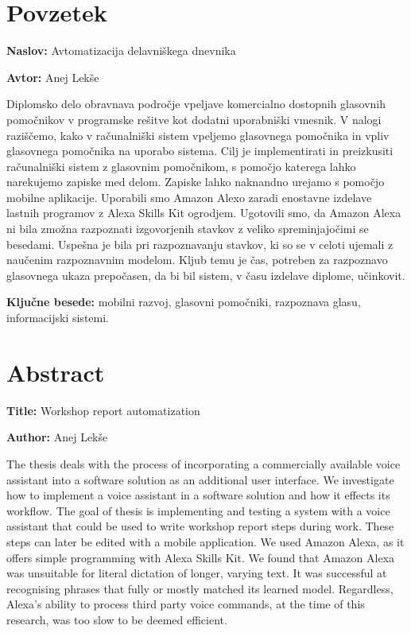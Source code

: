 \documentclass[a4paper, 12pt]{book}
\newcommand{\ttitle}{Avtomatizacija delavniškega dnevnika}
\newcommand{\ttitleEn}{Workshop report automatization}
\newcommand{\tauthor}{Anej Lekše}
\newcommand{\tkeywords}{mobilni razvoj, glasovni pomočniki, razpoznava glasu, informacijski sistemi}
\newcommand{\clearemptydoublepage}{\newpage{\pagestyle{empty}\cleardoublepage}}
\begin{document}
\chapter*{Povzetek}

\noindent\textbf{Naslov:} \ttitle
\bigskip

\noindent\textbf{Avtor:} \tauthor
\bigskip


\noindent Diplomsko delo obravnava področje vpeljave komercialno dostopnih glasovnih pomočnikov v programske rešitve kot dodatni uporabniški vmesnik.
V nalogi raziščemo, kako v računalniški sistem vpeljemo glasovnega pomočnika in vpliv glasovnega pomočnika na uporabo sistema.
Cilj je implementirati in preizkusiti računalniški sistem z glasovnim pomočnikom, s pomočjo katerega lahko narekujemo zapiske med delom. 
Zapiske lahko naknandno urejamo s pomočjo mobilne aplikacije.
Uporabili smo Amazon Alexo zaradi enostavne izdelave lastnih programov z Alexa Skills Kit ogrodjem.
Ugotovili smo, da Amazon Alexa ni bila zmožna razpoznati izgovorjenih stavkov z veliko spreminjajočimi se besedami.
Uspešna je bila pri razpoznavanju stavkov, ki so se v celoti ujemali z naučenim razpoznavnim modelom.
Kljub temu je čas, potreben za razpoznavo glasovnega ukaza prepočasen, da bi bil sistem, v času izdelave diplome, učinkovit.
\bigskip

\noindent\textbf{Ključne besede:} \tkeywords.
\clearemptydoublepage

\chapter*{Abstract}

\noindent\textbf{Title:} \ttitleEn
\bigskip

\noindent\textbf{Author:} \tauthor
\bigskip

\noindent The thesis deals with the process of incorporating a commercially available voice assistant into a software solution as an additional user interface.
We investigate how to implement a voice assistant in a software solution and how it effects its workflow.
The goal of thesis is implementing and testing a system with a voice assistant that could be used to write workshop report steps during work.
These steps can later be edited with a mobile application.
We used Amazon Alexa, as it offers simple programming with Alexa Skills Kit.
We found that Amazon Alexa was unsuitable for literal dictation of longer, varying text.
It was successful at recognising phrases that fully or mostly matched its learned model.
Regardless, Alexa's ability to process third party voice commands, at the time of this research, was too slow to be deemed efficient.
\end{document}
